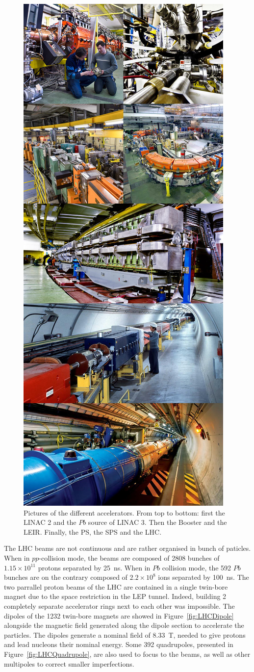 	\begin{figure}[H]
		\centering
		\includegraphics[width=0.5\linewidth]{fig/chapt2/CERN-accelerators.jpg}
		\caption{\label{fig:CERNAccelerators} Pictures of the different accelerators. From top to bottom: first the LINAC 2 and the $Pb$ source of LINAC 3. Then the Booster and the LEIR. Finally, the PS, the SPS and the LHC.}
	\end{figure}
	
	The LHC beams are not continuous and are rather organised in bunch of paticles. When in $pp$-collision mode, the beams are composed of 2808 bunches of $1.15 \times 10^{11}$ protons separated by \SI{25}{ns}. When in $Pb$ collision mode, the 592 $Pb$ bunches are on the contrary composed of $2.2 \times 10^8$ ions separated by \SI{100}{ns}. The two parrallel proton beams of the LHC are contained in a single twin-bore magnet due to the space restriction in the LEP tunnel. Indeed, building 2 completely separate accelerator rings next to each other was impossible. The dipoles of the 1232 twin-bore magnets are showed in Figure~\ref{fig:LHCDipole} alongside the magnetic field generated along the dipole section to accelerate the particles. The dipoles generate a nominal field of \SI{8.33}{T}, needed to give protons and lead nucleons their nominal energy. Some 392 quadrupoles, presented in Figure~\ref{fig:LHCQuadrupole}, are also used to focus to the beams, as well as other multipoles to correct smaller imperfections.
	
